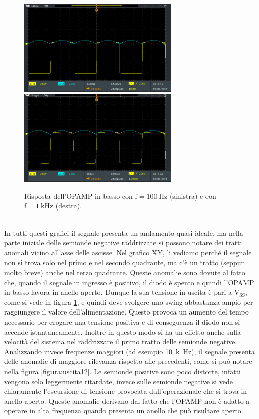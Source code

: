 \documentclass{report}
\begin{document}
\begin{figure}[h!]
	\centering
	\includegraphics[height=4.6cm]{immagini/TEK00002}
	\includegraphics[height=4.6cm]{immagini/TEK00004}
	\caption{Risposta dell'OPAMP in basso con $\mathrm{f= \SI{100}{\hertz}}$ (sinistra) e con $\mathrm{f= \SI{1}{k\hertz}}$ (destra).}
	\label{figura:uscita111}
\end{figure}
\\In tutti questi grafici il segnale presenta un andamento quasi ideale, ma nella parte iniziale delle semionde negative raddrizzate si possono notare dei tratti anomali vicino all'asse delle ascisse. Nel grafico XY, li vediamo perché il segnale non si trova solo nel primo e nel secondo quadrante, ma c'è un tratto (seppur molto breve) anche nel terzo quadrante. Queste anomalie sono dovute al fatto che, quando il segnale in ingresso è positivo, il diodo è spento e quindi l'OPAMP in basso lavora in anello aperto. Dunque la sua tensione in uscita è pari a $\displaystyle\mathrm{V_{SS}}$, come si vede in figura \ref{figura:uscita111}, e quindi deve svolgere uno swing abbastanza ampio per raggiungere il valore dell'alimentazione. Questo provoca un aumento del tempo necessario per erogare una tensione positiva e di conseguenza il diodo non si accende istantaneamente. Inoltre in questo modo si ha un effetto anche sulla velocità del sistema nel raddrizzare il primo tratto delle semionde negative.
\\Analizzando invece frequenze maggiori (ad esempio \SI{10}{k\hertz}), il segnale presenta delle anomalie di maggiore rilevanza rispetto alle precedenti, come si può notare nella figura \ref{figura:uscita12}. Le semionde positive sono poco distorte, infatti vengono solo leggermente ritardate, invece sulle semionde negative si vede chiaramente l'escursione di tensione provocata dall'operazionale che si trova in anello aperto. Queste anomalie derivano dal fatto che l'OPAMP non è adatto a operare in alta frequenza quando presenta un anello che può risultare aperto.
\end{document}
